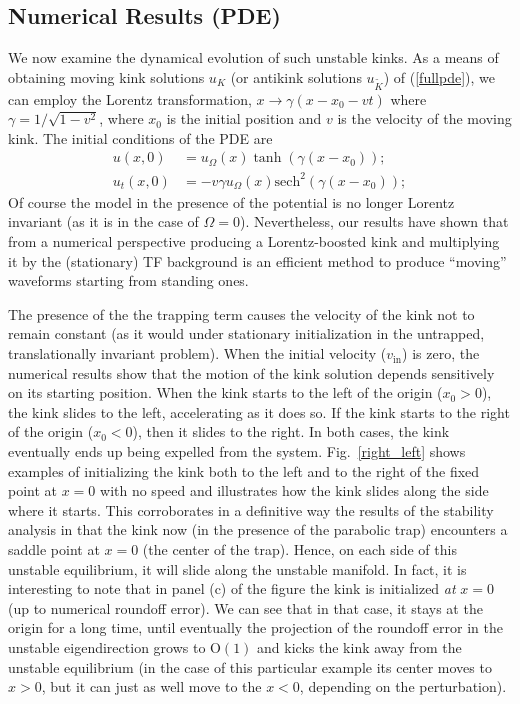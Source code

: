 \documentclass[vecphys]{svmult}		%
\newcommand{\sech}{\text{sech}}
\begin{document}


\subsection{Numerical Results (PDE)}


We now examine the dynamical evolution of such unstable kinks.
As a means of obtaining moving kink solutions $u_{K}$ (or antikink solutions $u_{\tilde{K}}$) of (\ref{fullpde}), we can employ the
Lorentz transformation, $x\to  \gamma(x-x_0-vt)$
where $\gamma=1/\sqrt{1-v^2}$, where
$x_0$ is the initial position and $v$ is the velocity of the moving kink. The initial conditions of the PDE are
\begin{align*}u(x,0)&=u_{\Omega}(x) \tanh(\gamma (x-x_0)); \\
u_t(x,0)&=-v\gamma u_{\Omega}(x) \sech^2(\gamma(x-x_0));
\end{align*}
Of course the model in the presence of the potential
is no longer Lorentz invariant (as it is in the case of $\Omega=0$).
Nevertheless, our results have shown that
from a numerical perspective producing a Lorentz-boosted
kink and multiplying it by the (stationary) TF background is
an efficient method to produce ``moving'' waveforms
starting from standing ones.



The presence of the the trapping term causes the velocity of the kink not to remain constant
(as it would under stationary initialization in the untrapped, translationally
invariant problem). When the initial velocity ($v_\mathrm{in}$) is zero,
the numerical results show that the motion of the kink solution depends sensitively on
its starting position. When the kink starts to the left of the origin
($x_0>0$), the kink slides to the left, accelerating as it does so. If the kink starts to the right of the origin ($x_0<0$), then it slides to the right. In both cases, the kink eventually ends up being expelled from the system.
Fig.~\ref{right_left} shows examples of initializing the kink both
to the left and to the right of the fixed point {at $x=0$ } with no speed and
illustrates how the kink slides along the side where it starts.
This corroborates in a definitive way the results of the stability
analysis in that the kink now (in the presence of the parabolic
trap) encounters a saddle point at $x=0$ (the center of the trap).
Hence, on each side of this unstable equilibrium, it will slide
along the unstable manifold. In fact, it is interesting to note
that in panel (c) of the figure the kink is initialized {\it at}
$x=0$ (up to numerical roundoff error). We can see that in that
case, it stays at the origin for a long time, until eventually
the projection of the roundoff error in the unstable eigendirection
grows to O$(1)$ and kicks the kink away from the unstable equilibrium
(in the case of this particular example its center moves to $x>0$,
but it can just as well move to the $x<0$, depending on the perturbation).
\end{document}
